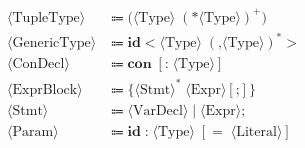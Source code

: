 \documentclass[11pt, a4paper]{article}
\begin{document}
\begin{align*}
\langle \text{TupleType} \rangle &\Coloneqq \textbf{(} \langle \text{Type} \rangle \; (\textbf{*} \langle \text{Type} \rangle )^+ \textbf{)} \\
\langle \text{GenericType} \rangle &\Coloneqq \textbf{id} \mathbf{<}\langle \text{Type} \rangle \; (\textbf{,} \langle \text{Type} \rangle)^* \mathbf{>} \\
\langle \text{ConDecl} \rangle &\Coloneqq \textbf{con} \; [ \textbf{:} \; \langle \text{Type} \rangle ] \\
\langle \text{ExprBlock} \rangle &\Coloneqq \textbf{\{} \langle \text{Stmt} \rangle^* \; \langle \text{Expr} \rangle [\textbf{;}] \textbf{\}} \\
\langle \text{Stmt} \rangle &\Coloneqq \langle \text{VarDecl} \rangle \mid \langle \text{Expr} \rangle \textbf{;} \\ 
\langle \text{Param} \rangle &\Coloneqq \textbf{id} \; \textbf{:} \; \langle \text{Type} \rangle \; [ \mathbf{=} \; \langle \text{Literal} \rangle ]
\end{align*}
\end{document}
